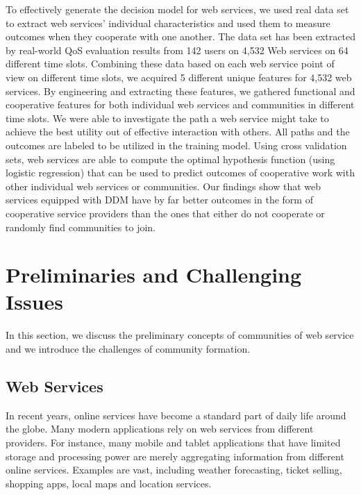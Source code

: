 To effectively generate the decision model for web services, we used real data set to extract web services' individual characteristics and used them to measure outcomes when they cooperate with one another. The data set has been extracted by real-world QoS evaluation results from 142 users on 4,532 Web services on 64 different time slots. Combining these data based on each web service point of view on different time slots, we acquired 5 different unique features for 4,532 web services. By engineering and extracting these features, we gathered functional and cooperative features for both individual web services and communities in different time slots. We were able to investigate the path a web service might take to achieve the best utility out of effective interaction with others. All paths and the outcomes are labeled to be utilized in the training model. Using cross validation sets, web services are able to compute the optimal hypothesis function (using logistic regression) that can be used to predict outcomes of cooperative work with other individual web services or communities. Our findings show that web services equipped with DDM have by far better outcomes in the form of cooperative service providers than the ones that either do not cooperate or randomly find communities to join.

\section{Preliminaries and Challenging Issues}\label{s4:preliminaries}
In this section, we discuss the preliminary concepts of communities of web service and we introduce the challenges of community formation.

\subsection{Web Services}\label{s:ws}

In recent years, online services have become a standard part of daily life around the globe. Many modern applications rely on web services from different providers. For instance, many mobile and tablet applications that have limited storage and processing power are merely aggregating information from different online services. Examples are vast, including weather forecasting, ticket selling, shopping apps, local maps and location services.

